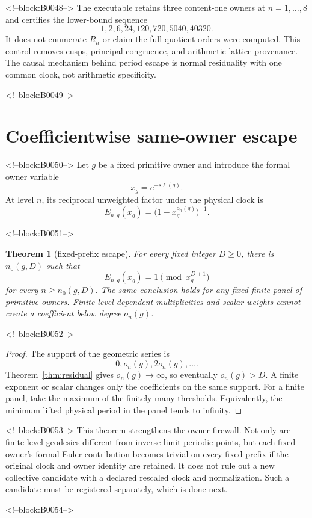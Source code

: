 \documentclass[11pt]{article}
\newtheorem{theorem}{Theorem}[section]
\theoremstyle{definition}
\theoremstyle{remark}
\begin{document}
<!--block:B0048-->
The executable retains three content-one owners at $n=1,\ldots,8$ and certifies the lower-bound sequence
\[
1,2,6,24,120,720,5040,40320.
\]
It does not enumerate $R_n$ or claim the full quotient orders were computed. This control removes cusps, principal congruence, and arithmetic-lattice provenance. The causal mechanism behind period escape is normal residuality with one common clock, not arithmetic specificity.

<!--block:B0049-->
\section{Coefficientwise same-owner escape}

<!--block:B0050-->
Let $g$ be a fixed primitive owner and introduce the formal owner variable
\[
x_g=e^{-s\ell(g)}.
\]
At level $n$, its reciprocal unweighted factor under the physical clock is
\[
E_{n,g}(x_g)=\bigl(1-x_g^{o_n(g)}\bigr)^{-1}.
\]

<!--block:B0051-->
\begin{theorem}[fixed-prefix escape]\label{thm:prefix}
For every fixed integer $D\geq0$, there is $n_0(g,D)$ such that
\[
E_{n,g}(x_g)=1\pmod{x_g^{D+1}}
\]
for every $n\geq n_0(g,D)$. The same conclusion holds for any fixed finite panel of primitive owners. Finite level-dependent multiplicities and scalar weights cannot create a coefficient below degree $o_n(g)$.
\end{theorem}

<!--block:B0052-->
\begin{proof}
The support of the geometric series is
\[
0,o_n(g),2o_n(g),\ldots.
\]
Theorem~\ref{thm:residual} gives $o_n(g)\to\infty$, so eventually $o_n(g)>D$. A finite exponent or scalar changes only the coefficients on the same support. For a finite panel, take the maximum of the finitely many thresholds. Equivalently, the minimum lifted physical period in the panel tends to infinity.
\end{proof}

<!--block:B0053-->
This theorem strengthens the owner firewall. Not only are finite-level geodesics different from inverse-limit periodic points, but each fixed owner's formal Euler contribution becomes trivial on every fixed prefix if the original clock and owner identity are retained. It does not rule out a new collective candidate with a declared rescaled clock and normalization. Such a candidate must be registered separately, which is done next.

<!--block:B0054-->
\end{document}
